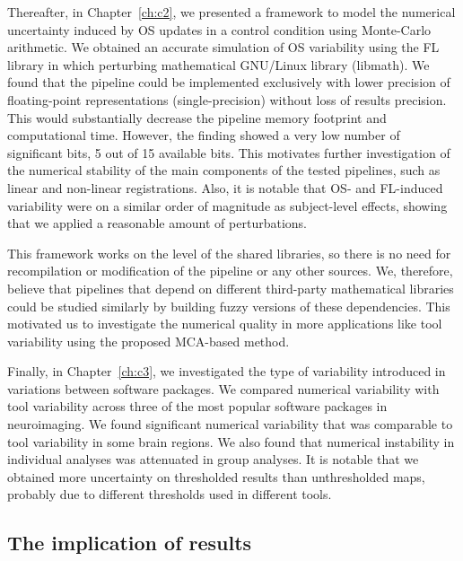 Thereafter, in Chapter~\ref{ch:c2}, we presented a framework to model the numerical uncertainty induced by OS updates in a control condition using Monte-Carlo arithmetic. 
We obtained an accurate simulation of OS variability using the FL library in which perturbing mathematical GNU/Linux library (libmath).
We found that the pipeline could be implemented exclusively with lower precision of floating-point representations (single-precision)
without loss of results precision. This would substantially decrease the pipeline memory footprint and computational time.
However, the finding showed a very low number of significant bits, 5 out of 15 available bits.
This motivates further investigation of the numerical stability of the main components of the tested pipelines, such as linear and non-linear registrations.
Also, it is notable that OS- and FL-induced variability were on a similar order of magnitude as subject-level effects,
showing that we applied a reasonable amount of perturbations.

This framework works on the level of the shared libraries, so there is no need for recompilation or modification
of the pipeline or any other sources.
We, therefore, believe that pipelines that depend
on different third-party mathematical libraries could be studied similarly by building fuzzy
versions of these dependencies. This motivated us to investigate the numerical quality in
more applications like tool variability using the proposed MCA-based method.

Finally, in Chapter~\ref{ch:c3}, we investigated the type of variability introduced in variations between software packages.
We compared numerical variability with tool variability across three of the most popular software packages in neuroimaging.
We found significant numerical variability that was comparable to tool variability in some brain regions.
We also found that numerical instability in individual analyses was attenuated in group analyses.
It is notable that we obtained more uncertainty on thresholded results than unthresholded maps, probably due to
different thresholds used in different tools.


\subsection{The implication of results}

